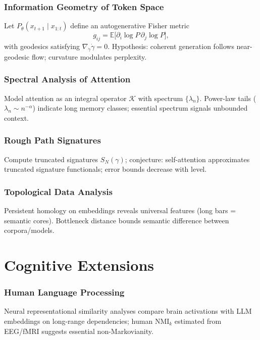 \documentclass[12pt,a4paper]{article}
\theoremstyle{definition}
\begin{document}
\section{Information Geometry of Token Space}
Let $P_\theta(x_{t+1}\!\mid\!x_{1:t})$ define an autogenerative Fisher metric
\[
g_{ij}=\mathbb{E}\!\big[\partial_i\log P\,\partial_j\log P\big],
\]
with geodesics satisfying $\nabla_{\dot\gamma}\dot\gamma=0$. Hypothesis: coherent generation follows near-geodesic flow; curvature modulates perplexity.

\section{Spectral Analysis of Attention}
Model attention as an integral operator $\mathcal{K}$ with spectrum $\{\lambda_n\}$. Power-law tails (\(\lambda_n\!\sim\! n^{-\alpha}\)) indicate long memory classes; essential spectrum signals unbounded context.

\section{Rough Path Signatures}
Compute truncated signatures $S_N(\gamma)$; conjecture: self-attention approximates truncated signature functionals; error bounds decrease with level.

\section{Topological Data Analysis}
Persistent homology on embeddings reveals universal features (long bars = semantic cores). Bottleneck distance bounds semantic difference between corpora/models.

\part{Cognitive Extensions}

\section{Human Language Processing}
Neural representational similarity analyses compare brain activations with LLM embeddings on long-range dependencies; human $\mathrm{NMI}_k$ estimated from EEG/fMRI suggests essential non-Markovianity.
\end{document}
